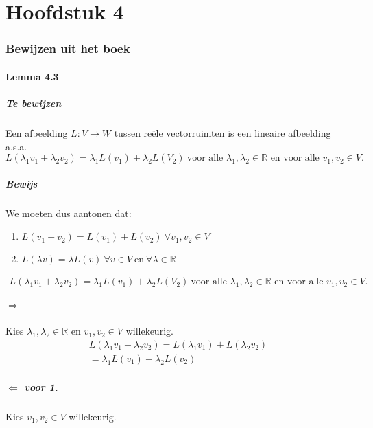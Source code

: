 \documentclass[lineaire_algebra_oplossingen.tex]{subfiles}
\begin{document}
\part{Hoofdstuk 4}
\section{Bewijzen uit het boek}
\subsection{Lemma 4.3}
\subsubsection*{Te bewijzen}
Een afbeelding $L:V\rightarrow W$ tussen re\"ele vectorruimten is een lineaire afbeelding a.s.a.
$$L(\lambda_1v_1+\lambda_2v_2) = \lambda_1L(v_1)+\lambda_2L(V_2)\ \text{voor alle $\lambda_1,\lambda_2 \in \mathbb{R}$ en voor alle $v_1,v_2 \in V$}.$$
\subsubsection*{Bewijs}
We moeten dus aantonen dat:
\begin{enumerate}
\item $L(v_1+v_2) = L(v_1) + L(v_2) \ \forall v_1,v_2 \in V$
\item $L(\lambda v) = \lambda L(v) \ \forall v \in V \ \text{en} \ \forall \lambda \in \mathbb{R}$
\end{enumerate}
\begin{align*}L(\lambda_1v_1+\lambda_2v_2) = \lambda_1L(v_1)+\lambda_2L(V_2)\ \text{voor alle $\lambda_1,\lambda_2 \in \mathbb{R}$ en voor alle $v_1,v_2 \in V$}. \tag{3.}
\end{align*}

\subsubsection*{$\Rightarrow$}
Kies $\lambda_1,\lambda_2 \in \mathbb{R}$ en $v_1,v_2 \in V$ willekeurig.
\begin{align*}
L(\lambda_1 v_1 + \lambda_2 v_2) = L(\lambda_1 v_1) + L(\lambda_2 v_2)\tag{wegens 1.}\\
=\lambda_1 L(v_1)+ \lambda_2 L(v_2) \tag{wegens 2.}
\end{align*}

\subsubsection*{$\Leftarrow$ voor 1.}
Kies $v_1,v_2 \in V$ willekeurig.
\end{document}
